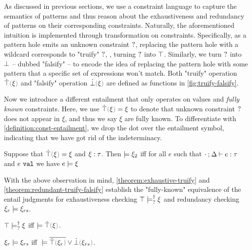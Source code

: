 As discussed in previous sections, we use a constraint language to capture the semantics of patterns and thus reason about the exhaustiveness and redundancy of patterns on their corresponding constraints. Naturally, the aforementioned intuition is implemented through transformation on constraints. Specifically, as a pattern hole emits an unknown constraint $\mathtt{?}$, replacing the pattern hole with a wildcard corresponds to "truify" $\mathtt{?}$, \ie, turning $\mathtt{?}$ into $\top$. Similarly, we turn $\mathtt{?}$ into $\bot$ -- dubbed "falsify" -- to encode the idea of replacing the pattern hole with some pattern that a specific set of expressions won't match. Both "truify" operation $\ctruify{\xi}$ and "falsify" operation $\cfalsify{\xi}$ are defined as functions in \autoref{fig:truify-falsify}. 



Now we introduce a different entailment that only operates on values and \textit{fully known} constraints. 
Here, we use $\ctruify{\xi}=\xi$ to denote that unknown constraint $\mathtt{?}$ does not appear in $\xi$, and thus we say $\xi$ are fully known. 
To differentiate with \autoref{definition:const-entailment}, we drop the dot over the entailment symbol, indicating that we have got rid of the indeterminacy. 

\begin{definition}
  \label{definition:valid-constraint}
  Suppose that $\ctruify{\xi}=\xi$ and $\xi : \tau$.
  Then $\models \xi_2$ iff for all $e$ such that $\cdot \mathbin{;} \Delta \vdash e : \tau$ and $e ~\mathtt{val}$ we have $e \models \xi$
\end{definition}

With the above observation in mind, \autoref{theorem:exhaustive-truify} and \autoref{theorem:redundant-truify-falsify} establish the "fully-known" equivalence of the entail judgments for exhaustiveness checking $\top \models_{?}^{\dag} \xi$ and redundancy checking $\xi_r \models \xi_{rs}$.

\begin{theorem}
\label{theorem:exhaustive-truify}
  $\top \models_{?}^{\dag} \xi$ iff $\ccsatisfy{}{\ctruify{\xi}}$.
\end{theorem}

\begin{theorem}
\label{theorem:redundant-truify-falsify}
  $\xi_r \models \xi_{rs}$ iff $\ccsatisfy{\;}{\cor{\cdual{\ctruify{\xi_r}}}{\cfalsify{\xi_{rs}}}}$.
\end{theorem}


